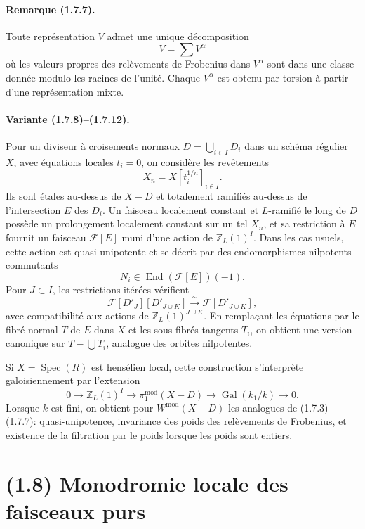 \documentclass[11pt]{article}
\theoremstyle{remark}
\newcommand{\ZZ}{\mathbb{Z}}
\newcommand{\Spec}{\operatorname{Spec}}
\newcommand{\Gal}{\operatorname{Gal}}
\newcommand{\End}{\operatorname{End}}
\begin{document}
\paragraph{Remarque (1.7.7).}
Toute représentation $V$ admet une unique décomposition
\[
V=\sum V^\alpha
\]
où les valeurs propres des relèvements de Frobenius dans $V^\alpha$ sont dans une classe donnée modulo les racines de l'unité. Chaque $V^\alpha$ est obtenu par torsion à partir d'une représentation mixte.

\paragraph{Variante (1.7.8)--(1.7.12).}
Pour un diviseur à croisements normaux $D=\bigcup_{i\in I}D_i$ dans un schéma régulier $X$, avec équations locales $t_i=0$, on considère les revêtements
\[
X_n=X[t_i^{1/n}]_{i\in I}.
\]
Ils sont étales au-dessus de $X-D$ et totalement ramifiés au-dessus de l'intersection $E$ des $D_i$. Un faisceau localement constant et $L$-ramifié le long de $D$ possède un prolongement localement constant sur un tel $X_n$, et sa restriction à $E$ fournit un faisceau $\mathcal F[E]$ muni d'une action de $\ZZ_L(1)^I$. Dans les cas usuels, cette action est quasi-unipotente et se décrit par des endomorphismes nilpotents commutants
\[
N_i\in\End(\mathcal F[E])(-1).
\]
Pour $J\subset I$, les restrictions itérées vérifient
\begin{equation}\tag{1.7.9.1}
\mathcal F[D'_J][D'_{J\cup K}]\xrightarrow{\sim}\mathcal F[D'_{J\cup K}],
\end{equation}
avec compatibilité aux actions de $\ZZ_L(1)^{J\cup K}$. En remplaçant les équations par le fibré normal $T$ de $E$ dans $X$ et les sous-fibrés tangents $T_i$, on obtient une version canonique sur $T-\bigcup T_i$, analogue des orbites nilpotentes.

Si $X=\Spec(R)$ est hensélien local, cette construction s'interprète galoisiennement par l'extension
\[
0\to\ZZ_L(1)^I\to\pi_1^{\mathrm{mod}}(X-D)\to\Gal(k_1/k)\to0.
\]
Lorsque $k$ est fini, on obtient pour $W^{\mathrm{mod}}(X-D)$ les analogues de (1.7.3)--(1.7.7): quasi-unipotence, invariance des poids des relèvements de Frobenius, et existence de la filtration par le poids lorsque les poids sont entiers.

\section*{(1.8) Monodromie locale des faisceaux purs}
\end{document}
